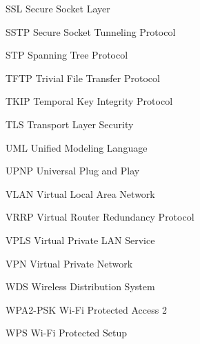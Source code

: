 \begin{seznamzkratek}{90}
		{SSL}								%
		{Secure Socket Layer}
		
		{SSTP}								%
		{Secure Socket Tunneling Protocol }
		
		{STP}								%
		{Spanning Tree Protocol}	
	
		{TFTP}								%
		{Trivial File Transfer Protocol}			
	
		{TKIP}								%
		{Temporal Key Integrity Protocol}		
	
		{TLS}								%
		{Transport Layer Security}	
	
		{UML}								%
		{Unified Modeling Language}
	
		{UPNP}								%
		{Universal Plug and Play}			
	
		{VLAN}								%
		{Virtual Local Area Network}	
		
		{VRRP}								%
		{Virtual Router Redundancy Protocol}		
	
		{VPLS}								%
		{Virtual Private LAN Service	}		
	
		{VPN}								%
		{Virtual Private Network}
		
		{WDS}								%
		{Wireless Distribution System}	
		
		{WPA2-PSK}								%
		{Wi-Fi Protected Access 2}	
	
		{WPS}								%
		{Wi-Fi Protected Setup}
												
\end{seznamzkratek}
